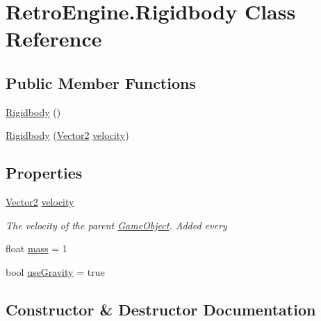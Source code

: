 \hypertarget{class_retro_engine_1_1_rigidbody}{}\section{Retro\+Engine.\+Rigidbody Class Reference}
\label{class_retro_engine_1_1_rigidbody}
\subsection*{Public Member Functions}
\begin{DoxyCompactItemize}
\item 
\mbox{\hyperlink{class_retro_engine_1_1_rigidbody_aec13095c5b5aa3254a000104db7038e0}{Rigidbody}} ()
\item 
\mbox{\hyperlink{class_retro_engine_1_1_rigidbody_a79cbe649b941f1c9ff99e5459a1abcd0}{Rigidbody}} (\mbox{\hyperlink{struct_retro_engine_1_1_vector2}{Vector2}} \mbox{\hyperlink{class_retro_engine_1_1_rigidbody_ae2a5f06e35972b8e557e9914186eda0e}{velocity}})
\end{DoxyCompactItemize}
\subsection*{Properties}
\begin{DoxyCompactItemize}
\item 
\mbox{\hyperlink{struct_retro_engine_1_1_vector2}{Vector2}} \mbox{\hyperlink{class_retro_engine_1_1_rigidbody_ae2a5f06e35972b8e557e9914186eda0e}{velocity}}
\begin{DoxyCompactList}\small\item\em The velocity of the parent \mbox{\hyperlink{class_retro_engine_1_1_game_object}{Game\+Object}}. Added every \end{DoxyCompactList}\item 
float \mbox{\hyperlink{class_retro_engine_1_1_rigidbody_ae07ea3f250d0a7c524a765b8141bd394}{mass}} = 1
\item 
bool \mbox{\hyperlink{class_retro_engine_1_1_rigidbody_a5adbd6924a85569d8c95d3e359ab4c5d}{use\+Gravity}} = true
\end{DoxyCompactItemize}


\subsection{Constructor \& Destructor Documentation}
\mbox{\label{class_retro_engine_1_1_rigidbody_aec13095c5b5aa3254a000104db7038e0}} 
